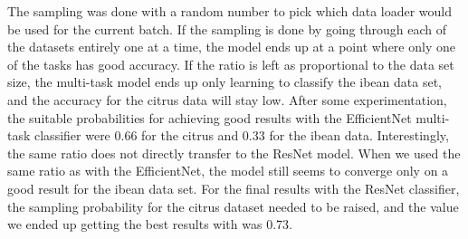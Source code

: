 The sampling was done with a random number to pick which data loader would be used for the current batch.
If the sampling is done by going through each of the datasets entirely one at a time, the model ends up at a point where only one of the tasks has good accuracy.
If the ratio is left as proportional to the data set size, the multi-task model ends up only learning to classify the ibean data set, and the accuracy for the citrus data will stay low.
After some experimentation, the suitable probabilities for achieving good results with the EfficientNet multi-task classifier were 0.66 for the citrus and 0.33 for the ibean data.
Interestingly, the same ratio does not directly transfer to the ResNet model. 
When we used the same ratio as with the EfficientNet, the model still seems to converge only on a good result for the ibean data set.
For the final results with the ResNet classifier, the sampling probability for the citrus dataset needed to be raised, and the value we ended up getting the best results with was 0.73.

